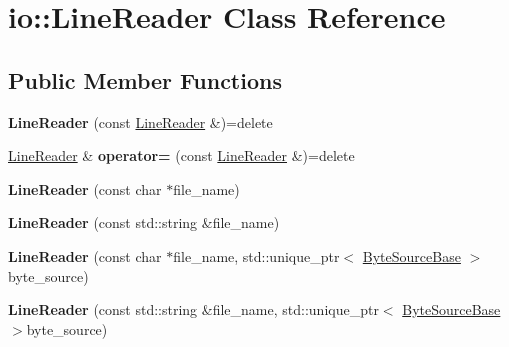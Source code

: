 \hypertarget{classio_1_1_line_reader}{}\section{io\+:\+:Line\+Reader Class Reference}
\label{classio_1_1_line_reader}
\subsection*{Public Member Functions}
\begin{DoxyCompactItemize}
\item 
\mbox{\label{classio_1_1_line_reader_a84f2957de769bb701eaaddfd8bc004dd}} 
{\bfseries Line\+Reader} (const \hyperlink{classio_1_1_line_reader}{Line\+Reader} \&)=delete
\item 
\mbox{\label{classio_1_1_line_reader_a9ebd7beca16060ffc0ea8df3c0c6ff25}} 
\hyperlink{classio_1_1_line_reader}{Line\+Reader} \& {\bfseries operator=} (const \hyperlink{classio_1_1_line_reader}{Line\+Reader} \&)=delete
\item 
\mbox{\label{classio_1_1_line_reader_a81a75d3f53725d35822f490007520e29}} 
{\bfseries Line\+Reader} (const char $\ast$file\+\_\+name)
\item 
\mbox{\label{classio_1_1_line_reader_ab0eb26f44fa6b18f9c39dfb2561ac882}} 
{\bfseries Line\+Reader} (const std\+::string \&file\+\_\+name)
\item 
\mbox{\label{classio_1_1_line_reader_af4ebb130a7d6c78356573f6d0304266c}} 
{\bfseries Line\+Reader} (const char $\ast$file\+\_\+name, std\+::unique\+\_\+ptr$<$ \hyperlink{classio_1_1_byte_source_base}{Byte\+Source\+Base} $>$byte\+\_\+source)
\item 
\mbox{\label{classio_1_1_line_reader_ab625b3a8001dca811b0e211c6cfc1b28}} 
{\bfseries Line\+Reader} (const std\+::string \&file\+\_\+name, std\+::unique\+\_\+ptr$<$ \hyperlink{classio_1_1_byte_source_base}{Byte\+Source\+Base} $>$byte\+\_\+source)
\item 
\mbox{\label{classio_1_1_line_reader_ad5a65d6f23474884061a77ea858c042b}} 

\end{DoxyCompactItemize}
